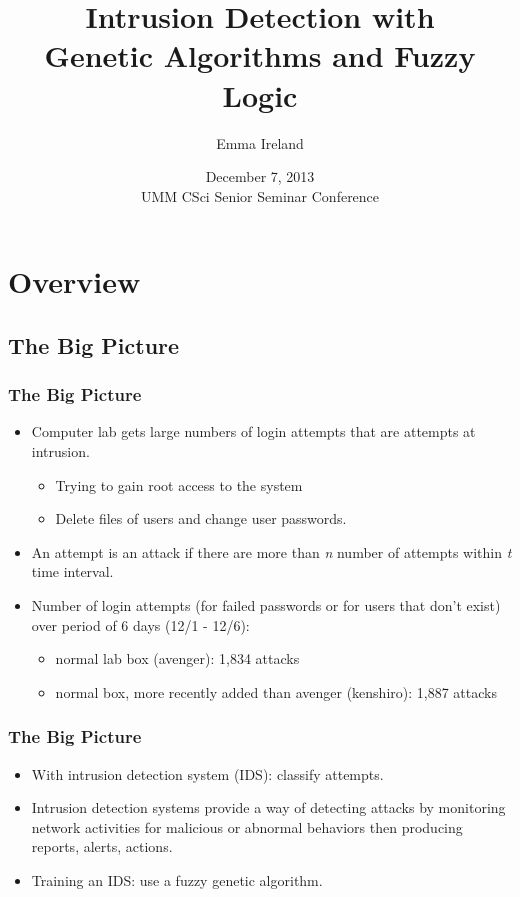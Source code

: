 \documentclass{beamer}
\title[Intrusion Detection]{Intrusion Detection with \\ Genetic Algorithms and Fuzzy Logic}
\author[Ireland]{Emma Ireland}
\institute[U of Minn, Morris]
{
  Division of Science and Mathematics \\
  University of Minnesota, Morris \\
  Morris, Minnesota, USA
}
\date[December 7, 2013] %
{December 7, 2013 \\ UMM CSci Senior Seminar Conference}
\newcommand{\linespace}{\vskip 0.25cm}
\begin{document}
\begin{frame}
  \titlepage
\end{frame}


\section*{Overview}

\subsection*{The Big Picture}

\begin{frame}
  \frametitle{The Big Picture}
  \begin{itemize}
  	\item Computer lab gets large numbers of login attempts that are attempts at intrusion.
	\begin{itemize}
		\item Trying to gain root access to the system
		\item Delete files of users and change user passwords.
	\end{itemize}
	\linespace
	\linespace
	\linespace

	\item An attempt is an attack if there are more than \emph{n} number of attempts within \emph{t} time interval.
	\item Number of login attempts (for failed passwords or for users that don't exist) over period of 6 days (12/1 - 12/6):
	\begin{itemize}
		\item normal lab box (avenger): 1,834 attacks
		\item normal box, more recently added than avenger (kenshiro): 1,887 attacks
	\end{itemize}
  \end{itemize}
\end{frame}


\begin{frame}
  \frametitle{The Big Picture}
  \begin{itemize}
	\item With intrusion detection system (IDS): classify attempts.
	\item Intrusion detection systems provide a way of detecting attacks by monitoring network activities for malicious or abnormal behaviors then producing reports, alerts, actions.
	\item Training an IDS: use a fuzzy genetic algorithm.
  \end{itemize}
\end{frame}
\end{document}
